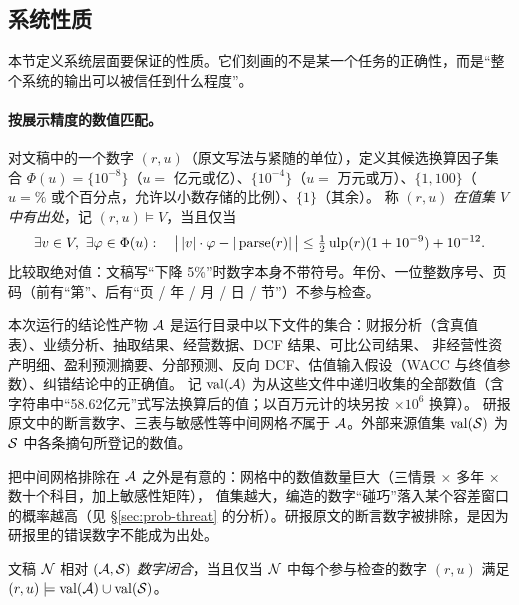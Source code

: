 \subsection{系统性质}
\label{sec:prob-props}

本节定义系统层面要保证的性质。它们刻画的不是某一个任务的正确性，而是“整个系统的输出可以被信任到什么程度”。

\paragraph{按展示精度的数值匹配。}
对文稿中的一个数字 $(r,u)$（原文写法与紧随的单位），定义其候选换算因子集合
$\Phi(u)=\{10^{-8}\}$（$u=$ 亿元或亿）、$\{10^{-4}\}$（$u=$ 万元或万）、$\{1,100\}$（$u=\%$ 或个百分点，允许以小数存储的比例）、$\{1\}$（其余）。
称 $(r,u)$ \emph{在值集 $V$ 中有出处}，记 $(r,u)\models V$，当且仅当
\begin{equation}
\exists v\in V,\ \exists \varphi\in\Phi(u):\quad \big|\,|v|\cdot\varphi - |\operatorname{parse}(r)|\,\big| \le \tfrac12\operatorname{ulp}(r)(1+10^{-9}) + 10^{-12}.
\label{eq:prob-models}
\end{equation}
比较取绝对值：文稿写“下降 5\%”时数字本身不带符号。年份、一位整数序号、页码（前有“第”、后有“页 / 年 / 月 / 日 / 节”）不参与检查。

\begin{definition}[结论性产物与值集]
\label{def:prob-art}
本次运行的结论性产物 $\mathcal{A}$ 是运行目录中以下文件的集合：财报分析（含真值表）、业绩分析、抽取结果、经营数据、DCF 结果、可比公司结果、
非经营性资产明细、盈利预测摘要、分部预测、反向 DCF、估值输入假设（WACC 与终值参数）、纠错结论中的正确值。
记 $\operatorname{val}(\mathcal{A})$ 为从这些文件中递归收集的全部数值（含字符串中“58.62亿元”式写法换算后的值；以百万元计的块另按 $\times10^6$ 换算）。
研报原文中的断言数字、三表与敏感性等中间网格\emph{不}属于 $\mathcal{A}$。外部来源值集 $\operatorname{val}(\mathcal{S})$ 为 $\mathcal{S}$ 中各条摘句所登记的数值。
\end{definition}

把中间网格排除在 $\mathcal{A}$ 之外是有意的：网格中的数值数量巨大（三情景 × 多年 × 数十个科目，加上敏感性矩阵），
值集越大，编造的数字“碰巧”落入某个容差窗口的概率越高（见 \S\ref{sec:prob-threat} 的分析）。研报原文的断言数字被排除，是因为研报里的错误数字不能成为出处。

\begin{definition}[数字闭合]
\label{def:prob-closure}
文稿 $\mathcal{N}$ 相对 $(\mathcal{A},\mathcal{S})$ \emph{数字闭合}，当且仅当 $\mathcal{N}$ 中每个参与检查的数字 $(r,u)$ 满足 $(r,u)\models\operatorname{val}(\mathcal{A})\cup\operatorname{val}(\mathcal{S})$。
\end{definition}

